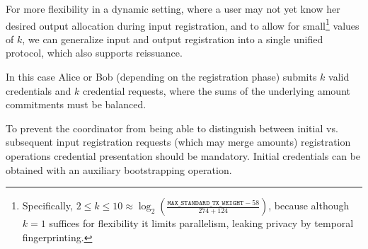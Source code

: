 \documentclass{article}
\begin{document}
For more flexibility in a dynamic setting, where a user may not yet know her desired output allocation during input registration, and to allow for small\footnote{Specifically, $2 \le k \le 10 \approx \log_2\left(\frac{\mathtt{MAX\_STANDARD\_TX\_WEIGHT} - 58}{274 + 124}\right)$, because although $k=1$ suffices for flexibility it limits parallelism, leaking privacy by temporal fingerprinting.} values of $k$, we can generalize input and output registration into a single unified protocol, which also supports reissuance.

In this case Alice or Bob (depending on the registration phase) submits $k$ valid credentials and $k$ credential requests, where the sums of the underlying amount commitments must be balanced.

To prevent the coordinator from being able to distinguish between initial vs. subsequent input registration requests (which may merge amounts) registration operations credential presentation should be mandatory. Initial credentials can be obtained with an auxiliary bootstrapping operation.
\end{document}
